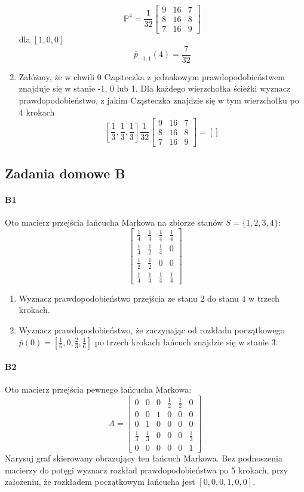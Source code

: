 \begin{enumerate}[label=\alph*)]
$$\mathbb{P}^4=\frac{1}{32}\begin{bmatrix}
9&16&7\\
8&16&8\\
7&16&9
\end{bmatrix}$$
dla $\left[1,0,0\right]$
$$\bar{p}_{-1,1}(4)=\frac{7}{32}$$
\item Załóżmy, że w chwili 0 Cząsteczka z jednakowym prawdopodobieństwem znajduje się w stanie -1, 0 lub 1. Dla każdego wierzchołka ścieżki wyznacz prawdopodobieństwo, z jakim Cząsteczka znajdzie się w tym wierzchołku po 4 krokach
$$\left[\frac{1}{3},\frac{1}{3},\frac{1}{3}\right]\frac{1}{32}\begin{bmatrix}
9&16&7\\
8&16&8\\
7&16&9
\end{bmatrix}=\left[\right]$$
\end{enumerate}


\subsection{Zadania domowe B}
\paragraph{B1} Oto macierz przejścia łańcucha Markowa na zbiorze stanów $S = \{1, 2, 3, 4\}$:
$$\begin{bmatrix}
\frac{1}{4}&\frac{1}{4}&\frac{1}{4}&\frac{1}{4}\\
\frac{1}{4}&\frac{1}{2}&\frac{1}{4}&0\\
\frac{1}{2}&\frac{1}{2}&0&0\\
\frac{1}{4}&\frac{1}{4}&\frac{1}{4}&\frac{1}{4}
\end{bmatrix}$$
\begin{enumerate}[label=\alph*)]
\item Wyznacz prawdopodobieństwo przejścia ze stanu 2 do stanu 4 w trzech krokach.
\item Wyznacz prawdopodobieństwo, że zaczynając od rozkładu początkowego $\bar{p}(0) = \left[ \frac{1}{6}, 0,\frac{2}{3},\frac{1}{6}\right]$ po trzech krokach łańcuch znajdzie się w stanie 3.
\end{enumerate}

\paragraph{B2} Oto macierz przejścia pewnego łańcucha Markowa: 
$$A=\begin{bmatrix}
0&0&0&\frac{1}{2}&\frac{1}{2}&0\\
0&0&1&0&0&0\\
0&1&0&0&0&0\\
\frac{1}{3}&\frac{1}{3}&0&0&0&\frac{1}{3}\\
0&0&0&0&0&1
\end{bmatrix}$$
Narysuj graf skierowany obrazujący ten łańcuch Markowa. Bez podnoszenia macierzy do potęgi wyznacz rozkład prawdopodobieństwa po 5 krokach, przy założeniu, że rozkładem początkowym łańcucha jest $[0, 0, 0, 1, 0, 0]$.

